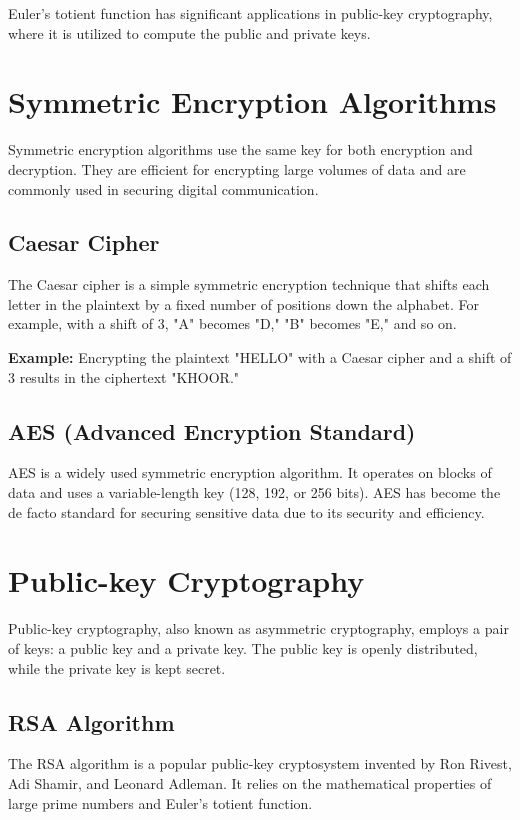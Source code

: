 \documentclass{article}
\begin{document}
Euler's totient function has significant applications in public-key cryptography, where it is utilized to compute the public and private keys.

\section{Symmetric Encryption Algorithms}
Symmetric encryption algorithms use the same key for both encryption and decryption. They are efficient for encrypting large volumes of data and are commonly used in securing digital communication.

\subsection{Caesar Cipher}
The Caesar cipher is a simple symmetric encryption technique that shifts each letter in the plaintext by a fixed number of positions down the alphabet. For example, with a shift of 3, "A" becomes "D," "B" becomes "E," and so on.

\textbf{Example:} Encrypting the plaintext "HELLO" with a Caesar cipher and a shift of 3 results in the ciphertext "KHOOR."

\subsection{AES (Advanced Encryption Standard)}
AES is a widely used symmetric encryption algorithm. It operates on blocks of data and uses a variable-length key (128, 192, or 256 bits). AES has become the de facto standard for securing sensitive data due to its security and efficiency.

\section{Public-key Cryptography}
Public-key cryptography, also known as asymmetric cryptography, employs a pair of keys: a public key and a private key. The public key is openly distributed, while the private key is kept secret.

\subsection{RSA Algorithm}
The RSA algorithm is a popular public-key cryptosystem invented by Ron Rivest, Adi Shamir, and Leonard Adleman. It relies on the mathematical properties of large prime numbers and Euler's totient function.
\end{document}
